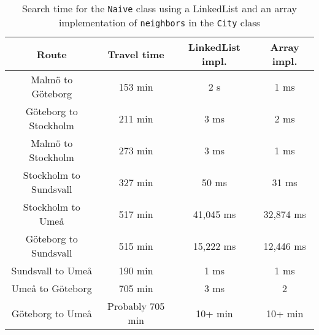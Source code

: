 \documentclass[a4paper,11pt]{article}
\begin{document}
\begin{table}[h!]
    \begin{center}
        \caption{Search time for the {\tt Naive} class using a LinkedList and an array implementation of
                {\tt neighbors} in the {\tt City} class}
        \label{tab:Naive}
        \begin{tabular}{|c|c|c|c|}
            \hline
            \textbf{Route}         & \textbf{Travel time} & \textbf{LinkedList impl.} & \textbf{Array impl.} \\
            \hline
            Malmö to Göteborg      & 153 min              & 2 s                       & 1 ms                 \\
            Göteborg to Stockholm  & 211 min              & 3 ms                      & 2 ms                 \\
            Malmö to Stockholm     & 273 min              & 3 ms                      & 1 ms                 \\
            Stockholm to Sundsvall & 327 min              & 50 ms                     & 31 ms                \\
            Stockholm to Umeå      & 517 min              & 41,045 ms                 & 32,874 ms            \\
            Göteborg to Sundsvall  & 515 min              & 15,222 ms                 & 12,446 ms            \\
            Sundsvall to Umeå      & 190 min              & 1 ms                      & 1 ms                 \\
            Umeå to Göteborg       & 705 min              & 3 ms                      & 2                    \\
            Göteborg to Umeå       & Probably 705 min     & 10+ min                   & 10+ min              \\
            \hline
        \end{tabular}
    \end{center}
\end{table}
\end{document}
